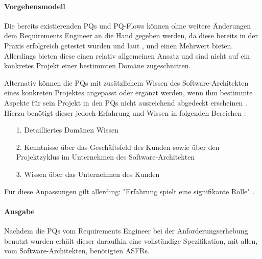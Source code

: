 \paragraph{Vorgehensmodell} \label{probing_model}

Die bereits existierenden PQs und PQ-Flows können ohne weitere Änderungen dem Requirements Engineer an die Hand gegeben werden, da diese bereits in der Praxis erfolgreich getestet wurden und laut \cite{Ros01}, \cite{Ros02} und \cite{Ros03} einen Mehrwert bieten. Allerdings bieten diese einen relativ allgemeinen Ansatz und sind nicht auf ein konkretes Projekt einer bestimmten Domäne zugeschnitten. 

Alternativ können die PQs mit zusätzlichem Wissen des Software-Architekten eines konkreten Projektes angepasst oder ergänzt werden, wenn ihm bestimmte Aspekte für sein Projekt in den PQs nicht ausreichend abgedeckt erscheinen \cite{Ros02}. Hierzu benötigt dieser jedoch Erfahrung und Wissen in folgenden Bereichen \cite{Ros02}: \\

\begin{itemize}
\item[1.] Detailliertes Domänen Wissen
\item[2.] Kenntnisse über das Geschäftsfeld des Kunden sowie über den Projektzyklus im Unternehmen des Software-Architekten
\item[3.] Wissen über das Unternehmen des Kunden
\end{itemize}

Für diese Anpassungen gilt allerding: "Erfahrung spielt eine signifikante Rolle" \cite{Ros02}. \\

\paragraph{Ausgabe}

Nachdem die PQs vom Requirements Engineer bei der Anforderungserhebung benutzt wurden erhält dieser daraufhin eine vollständige Spezifikation, mit allen, vom Software-Architekten, benötigten ASFRs.

